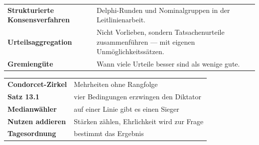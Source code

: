 \begin{forschung}
\begin{center}
{\small
\renewcommand{\arraystretch}{1.45}
\begin{tabular}{@{}P{3.4cm}P{4.8cm}@{}}
\toprule
\textbf{Strukturierte Konsensverfahren} & Delphi-Runden und Nominalgruppen in der Leitlinienarbeit.\\
\textbf{Urteilsaggregation} & Nicht Vorlieben, sondern Tatsachenurteile zusammenführen --- mit eigenen Unmöglichkeitssätzen.\\
\textbf{Gremiengüte} & Wann viele Urteile besser sind als wenige gute.\\
\bottomrule
\end{tabular}}
\end{center}

\begin{center}
\begin{minipage}{0.88\textwidth}
\end{minipage}
\end{center}
\end{forschung}

\begin{merksatz}
\begin{center}
\renewcommand{\arraystretch}{1.5}
\begin{tabular}{@{}P{3.0cm}P{5.6cm}@{}}
\toprule
\textbf{Condorcet-Zirkel} & Mehrheiten ohne Rangfolge\\
\textbf{Satz 13.1} & vier Bedingungen erzwingen den Diktator\\
\textbf{Medianwähler} & auf einer Linie gibt es einen Sieger\\
\textbf{Nutzen addieren} & Stärken zählen, Ehrlichkeit wird zur Frage\\
\textbf{Tagesordnung} & bestimmt das Ergebnis\\
\bottomrule
\end{tabular}
\end{center}

\begin{center}
\begin{minipage}{0.88\textwidth}
\end{minipage}
\end{center}
\end{merksatz}
